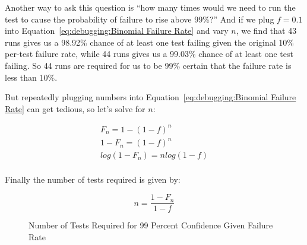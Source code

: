 Another way to ask this question is ``how many times would we need
to run the test to cause the probability of failure to rise above 99\%?''
And if we plug $f=0.1$ into 
Equation~\ref{eq:debugging:Binomial Failure Rate} and vary $n$,
we find that 43 runs gives us a 98.92\% chance of at least one test failing
given the original 10\% per-test failure rate,
while 44 runs gives us a 99.03\% chance of at least one test failing.
So 44 runs are required for us to be 99\% certain that the failure rate
is less than 10\%.

But repeatedly plugging numbers into
Equation~\ref{eq:debugging:Binomial Failure Rate}
can get tedious, so let's solve for $n$:

\begin{eqnarray}
	F_n = 1-\left(1-f\right)^n \\
	1 - F_n = \left(1-f\right)^n \\
	log \left(1 - F_n\right) = n log \left(1 - f\right) \\
\end{eqnarray}

Finally the number of tests required is given by:

\begin{equation}
	n = \frac{1 - F_n}{1 - f}
\label{eq:debugging:Binomial Number of Tests Required}
\end{equation}

\begin{figure}[tb]
\begin{center}
\end{center}
\caption{Number of Tests Required for 99 Percent Confidence Given Failure Rate}
\label{fig:debugging:Number of Tests Required for 99 Percent Confidence Given Failure Rate}
\end{figure}


